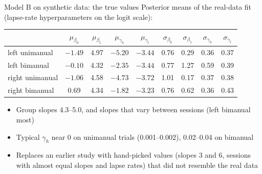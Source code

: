 \begin{frame}{Model B on synthetic data: the true values}
  Posterior means of the real-data fit (lapse-rate hyperparameters on the logit scale):
  \vspace{0.5em}

  \centering\small
  \begin{tabular}{lcccccccc}
    \toprule
     & $\mu_{\beta_0}$ & $\mu_{\beta_1}$ & $\mu_{\gamma_h}$ & $\mu_{\gamma_l}$
     & $\sigma_{\beta_0}$ & $\sigma_{\beta_1}$ & $\sigma_{\gamma_h}$ & $\sigma_{\gamma_l}$ \\
    \midrule
    left unimanual  & $-1.49$ & 4.97 & $-5.20$ & $-3.44$ & 0.76 & 0.29 & 0.36 & 0.37 \\
    left bimanual   & $-0.10$ & 4.32 & $-2.35$ & $-3.44$ & 0.77 & 1.27 & 0.59 & 0.39 \\
    right unimanual & $-1.06$ & 4.58 & $-4.73$ & $-3.72$ & 1.01 & 0.17 & 0.37 & 0.38 \\
    right bimanual  & 0.69    & 4.34 & $-1.82$ & $-3.23$ & 0.76 & 0.62 & 0.36 & 0.43 \\
    \bottomrule
  \end{tabular}

  \vspace{0.5em}
  \raggedright
  \begin{itemize}
    \item Group slopes 4.3--5.0, and slopes that vary between sessions (left bimanual most)
    \item Typical $\gamma_h$ near 0 on unimanual trials (0.001--0.002), 0.02--0.04 on bimanual
    \item Replaces an earlier study with hand-picked values (slopes 3 and 6, sessions with
          almost equal slopes and lapse rates) that did not resemble the real data
  \end{itemize}
\end{frame}

